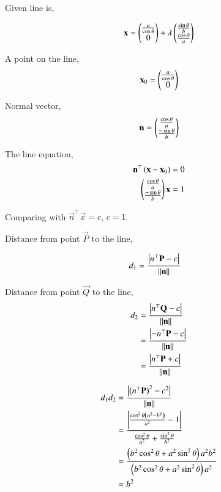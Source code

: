 \documentclass[journal,12pt,twocolumn]{IEEEtran}
\begin{document}
Given line is,

\begin{align}
\mathbf{x} = \begin{pmatrix}\frac{a}{\cos{\theta}}\\0\end{pmatrix} + \lambda \begin{pmatrix}\frac{\sin{\theta}}{b} \\ \frac{\cos{\theta}}{a} \end{pmatrix} 
\end{align}

A point on the line,
\begin{align}
	\mathbf{x}_0 =\begin{pmatrix}\frac{a}{\cos{\theta}}\\ 0\end{pmatrix}
\end{align}

Normal vector, 
\begin{align}
	\mathbf{n} =\begin{pmatrix}\frac{\cos{\theta}}{a} \\[1pt] \frac{-\sin{\theta}}{b} \end{pmatrix} 
\end{align}

The line equation,
\begin{align}
	\mathbf{n}^{\top} \left(\mathbf{x} - \mathbf{x}_0\right) &= 0 \\
	\begin{pmatrix}\frac{\cos{\theta}}{a} \\[1pt] \frac{-\sin{\theta}}{b} \end{pmatrix} \mathbf{x} &= 1
\end{align}

Comparing with $ \vec{n}^{\top}\vec{x} = c$, $c = 1$. 

Distance from point $\vec{P}$ to the line,

\begin{align}
	d_1 &= \frac{\left\vert n^{\top} \mathbf{P} -  c \right\vert }{\left\lVert\mathbf{n}\right\rVert}
\end{align}

Distance from point $\vec{Q}$ to the line,
\begin{align}
	d_2 &= \frac{\left\vert n^{\top} \mathbf{Q} -  c \right\vert }{\left\lVert\mathbf{n}\right\rVert} \\
&=\frac{\left\vert -n^{\top} \mathbf{P} -  c \right\vert }{\left\lVert\mathbf{n}\right\rVert}\\
&=\frac{\left\vert n^{\top} \mathbf{P} +  c \right\vert }{\left\lVert\mathbf{n}\right\rVert}
\end{align}


\begin{align}
	d_1d_2 &=\frac{\left\vert \left(n^{\top} \mathbf{P}\right)^2 -  c^2 \right\vert }{\left\lVert\mathbf{n}\right\rVert}\\
	&=\frac{\left\vert \frac{\cos^2{\theta}\left(a^2-b^2\right)}{a^2}- 1 \right\vert}{\frac{\cos^2{\theta}}{a^2} +\frac{\sin^2{\theta}}{b^2} }\\ 
	&= \frac{\left(b^2 \cos^2{\theta} + a^2 \sin^2{\theta}\right)a^2 b^2}{\left(b^2 \cos^2{\theta} + a^2 \sin^2{\theta}\right)a^2}\\
	&= b^2
\end{align}
\end{document}
